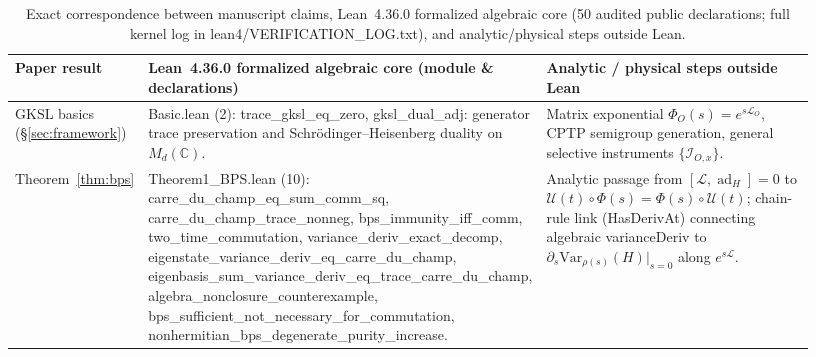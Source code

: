 \documentclass[11pt,a4paper]{article}
\theoremstyle{definition}
\theoremstyle{remark}
\newcommand{\ad}{\operatorname{ad}}
\newcommand{\cL}{\mathcal{L}}
\newcommand{\cU}{\mathcal{U}}
\newcommand{\cI}{\mathcal{I}}
\newcommand{\bbC}{\mathbb{C}}
\newcommand{\1}{\mathbf{1}}
\newcommand{\code}[1]{{\footnotesize\ttfamily #1}}
\begin{document}
\begin{table}[!tb]
\centering\scriptsize
\caption{Exact correspondence between manuscript claims, Lean~4.36.0 formalized algebraic core (50 audited public declarations; full kernel log in \code{lean4/\allowbreak VERIFICATION\_\allowbreak LOG.txt}), and analytic/physical steps outside Lean.}
\label{tab:lean}
\begin{tabular}{@{}>{\raggedright\arraybackslash}p{0.13\linewidth}>{\raggedright\arraybackslash}p{0.46\linewidth}>{\raggedright\arraybackslash}p{0.34\linewidth}@{}}
\toprule
Paper result & Lean~4.36.0 formalized algebraic core (module \& declarations) & Analytic / physical steps outside Lean \\
\midrule
GKSL basics (\S\ref{sec:framework}) & \code{Basic.lean} (2): \code{trace\_\allowbreak gksl\_\allowbreak eq\_\allowbreak zero}, \code{gksl\_\allowbreak dual\_\allowbreak adj}: generator trace preservation and Schr\"odinger--Heisenberg duality on $M_d(\bbC)$. & Matrix exponential $\Phi_O(s)=e^{s\cL_O}$, CPTP semigroup generation, general selective instruments $\{\cI_{O,x}\}$. \\
Theorem~\ref{thm:bps} & \code{Theorem1\_\allowbreak BPS.lean} (10): \code{carre\_\allowbreak du\_\allowbreak champ\_\allowbreak eq\_\allowbreak sum\_\allowbreak comm\_\allowbreak sq}, \code{carre\_\allowbreak du\_\allowbreak champ\_\allowbreak trace\_\allowbreak nonneg}, \code{bps\_\allowbreak immunity\_\allowbreak iff\_\allowbreak comm}, \code{two\_\allowbreak time\_\allowbreak commutation}, \code{variance\_\allowbreak deriv\_\allowbreak exact\_\allowbreak decomp}, \code{eigenstate\_\allowbreak variance\_\allowbreak deriv\_\allowbreak eq\_\allowbreak carre\_\allowbreak du\_\allowbreak champ}, \code{eigenbasis\_\allowbreak sum\_\allowbreak variance\_\allowbreak deriv\_\allowbreak eq\_\allowbreak trace\_\allowbreak carre\_\allowbreak du\_\allowbreak champ}, \code{algebra\_\allowbreak nonclosure\_\allowbreak counterexample}, \code{bps\_\allowbreak sufficient\_\allowbreak not\_\allowbreak necessary\_\allowbreak for\_\allowbreak commutation}, \code{nonhermitian\_\allowbreak bps\_\allowbreak degenerate\_\allowbreak purity\_\allowbreak increase}. & Analytic passage from $[\cL,\ad_H]=0$ to $\cU(t)\circ\Phi(s)=\Phi(s)\circ\cU(t)$; chain-rule link (\code{HasDerivAt}) connecting algebraic \code{varianceDeriv} to $\partial_s \mathrm{Var}_{\rho(s)}(H)|_{s=0}$ along $e^{s\cL}$. \\

\end{tabular}
\end{table}
\end{document}

